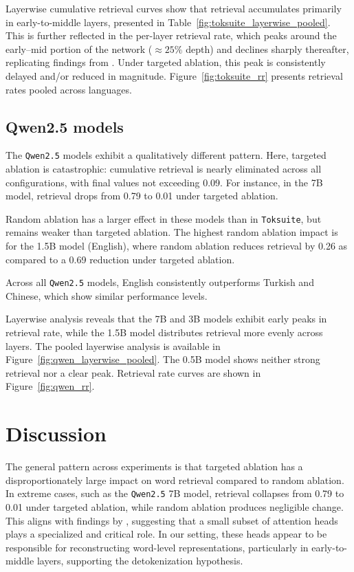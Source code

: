 \documentclass[11pt]{article}
\begin{document}
Layerwise cumulative retrieval curves show that retrieval accumulates primarily in early-to-middle layers, presented in Table~\ref{fig:toksuite_layerwise_pooled}. This is further reflected in the per-layer retrieval rate, which peaks around the early–mid portion of the network ($\approx 25\%$ depth) and declines sharply thereafter, replicating findings from \citet{kaplan2025}. Under targeted ablation, this peak is consistently delayed and/or reduced in magnitude. Figure~\ref{fig:toksuite_rr} presents retrieval rates pooled across languages.




\subsection{Qwen2.5 models}

The \texttt{Qwen2.5} models exhibit a qualitatively different pattern. Here, targeted ablation is catastrophic: cumulative retrieval is nearly eliminated across all configurations, with final values not exceeding 0.09. For instance, in the 7B model, retrieval drops from 0.79 to 0.01 under targeted ablation.

Random ablation has a larger effect in these models than in \texttt{Toksuite}, but remains weaker than targeted ablation. The highest random ablation impact is for the 1.5B model (English), where random ablation reduces retrieval by 0.26 as compared to a 0.69 reduction under targeted ablation.

Across all \texttt{Qwen2.5} models, English consistently outperforms Turkish and Chinese, which show similar performance levels.

Layerwise analysis reveals that the 7B and 3B models exhibit early peaks in retrieval rate, while the 1.5B model distributes retrieval more evenly across layers. The pooled layerwise analysis is available in Figure~\ref{fig:qwen_layerwise_pooled}. The 0.5B model shows neither strong retrieval nor a clear peak. Retrieval rate curves are shown in Figure~\ref{fig:qwen_rr}.




\section{Discussion}
\label{sec:discussion}

The general pattern across experiments is that targeted ablation has a disproportionately large impact on word retrieval compared to random ablation. In extreme cases, such as the \texttt{Qwen2.5} 7B model, retrieval collapses from 0.79 to 0.01 under targeted ablation, while random ablation produces negligible change. This aligns with findings by \citet{voita2019}, suggesting that a small subset of attention heads plays a specialized and critical role. In our setting, these heads appear to be responsible for reconstructing word-level representations, particularly in early-to-middle layers, supporting the detokenization hypothesis.
\end{document}
